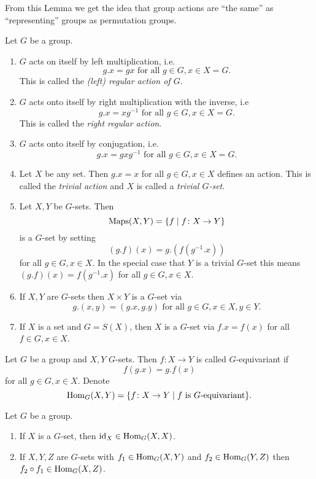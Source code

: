 From this Lemma we get the idea that group actions are ``the same'' as ``representing'' groups as permutation groups.


\begin{expls}
 Let $G$ be a group.
 \begin{enumerate}
  \item
   $G$ acts on itself by left multiplication, i.e.
   \[
    g.x = gx \text{ for all } g \in G, x \in X=G.
   \]
   This is called the \emph{(left) regular action of $G$}.
  \item
   $G$ acts onto itself by right multiplication with the inverse, i.e
   \[
    g.x = xg^{-1} \text{ for all } g \in G, x \in X=G.
   \]
   This is called the \emph{right regular action}.
  \item
   $G$ acts onto itself by conjugation, i.e.
   \[
    g.x = gxg^{-1} \text{ for all }g \in G, x \in X=G.
   \]
  \item
   Let $X$ be any set. Then $g.x = x$ for all $g \in G, x \in X$ defines an action. This is called the \emph{trivial action} and $X$ is called a \emph{trivial $G$-set}.
  \item
   Let $X, Y$ be $G$-sets. Then
   \[
    \operatorname{Maps}(X,Y) = \{f \mid f \colon X \to Y\}
   \]
   is a $G$-set by setting
   \[
    (g.f)(x) = g.\left(f\left(g^{-1}.x\right)\right)
   \]
   for all $g \in G, x \in X$.
   In the special case that $Y$ is a trivial $G$-set this means $(g.f)(x) = f(g^{-1}.x)$ for all $g \in G, x \in X$.
  \item
   If $X, Y$ are $G$-sets then $X \times Y$ is a $G$-set via
   \[
    g.(x,y) = (g.x,g.y) \text{ for all } g \in G, x \in X, y \in Y.
   \]
  \item
   If $X$ is a set and $G = S(X)$, then $X$ is a $G$-set via $f.x = f(x)$ for all $f \in G, x \in X$.
 \end{enumerate}
\end{expls}


\begin{defi}
 Let $G$ be a group and $X, Y$ $G$-sets. Then $f \colon X \to Y$ is called $G$-equivariant if
 \[
  f(g.x) = g.f(x)
 \]
 for all $g \in G, x \in X$. Denote
 \[
  \operatorname{Hom}_G(X,Y) = \{f \colon X \to Y \mid f \text{ is $G$-equivariant}\}.
 \]
\end{defi}


\begin{lem}
 Let $G$ be a group.
 \begin{enumerate}
  \item If $X$ is a $G$-set, then $\operatorname{id}_X \in \operatorname{Hom}_G(X,X)$.
  \item If $X, Y, Z$ are $G$-sets with $f_1 \in \operatorname{Hom}_G(X,Y)$ and $f_2 \in \operatorname{Hom}_G(Y,Z)$ then $f_2 \circ f_1 \in \operatorname{Hom}_G(X,Z)$.
 \end{enumerate}
\end{lem}


